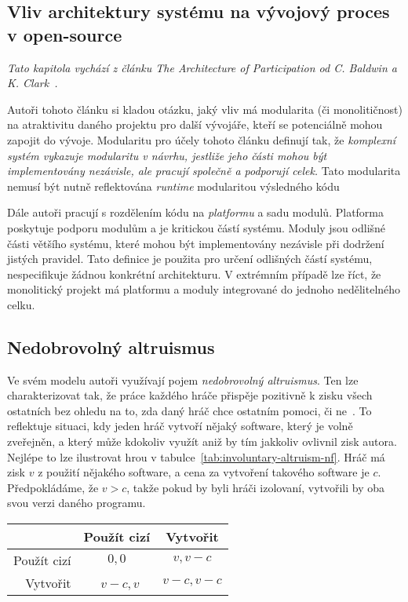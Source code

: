 \begin{multicols}{2}
\section{Vliv architektury systému na vývojový proces v open-source}
\label{ch:architecture-opensource}
	{\em Tato kapitola vychází z článku The Architecture of Participation od C. Baldwin a K. Clark~\cite{architecture-opensource}.}

	Autoři tohoto článku si kladou otázku, jaký vliv má modularita (či monolitičnost) na atraktivitu daného projektu pro další vývojáře, kteří se potenciálně mohou zapojit do vývoje. Modularitu pro účely tohoto článku definují tak, že {\em komplexní systém vykazuje modularitu v návrhu, jestliže jeho části mohou být implementovány nezávisle, ale pracují společně a podporují celek.} Tato modularita nemusí být nutně reflektována {\em runtime} modularitou výsledného kódu~\cite[kap. 2.1]{architecture-opensource}

	Dále autoři pracují s rozdělením kódu na {\em platformu} a sadu modulů. Platforma poskytuje podporu modulům a je kritickou částí systému. Moduly jsou odlišné části většího systému, které mohou být implementovány nezávisle při dodržení jistých pravidel. Tato definice je použita pro určení odlišných částí systému, nespecifikuje žádnou konkrétní architekturu. V extrémním případě lze říct, že monolitický projekt má platformu a moduly integrované do jednoho nedělitelného celku.

	\subsection*{Nedobrovolný altruismus}
		Ve svém modelu autoři využívají pojem {\em nedobrovolný altruismus}. Ten lze charakterizovat tak, že práce každého hráče přispěje pozitivně k zisku všech ostatních bez ohledu na to, zda daný hráč chce ostatním pomoci, či ne~\cite[kap. 3]{architecture-opensource}. To reflektuje situaci, kdy jeden hráč vytvoří nějaký software, který je volně zveřejněn, a který může kdokoliv využít aniž by tím jakkoliv ovlivnil zisk autora. Nejlépe to lze ilustrovat hrou v tabulce~\ref{tab:involuntary-altruism-nf}. Hráč má zisk $v$ z použití nějakého software, a cena za vytvoření takového software je $c$. Předpokládáme, že $v > c$, takže pokud by byli hráči izolovaní, vytvořili by oba svou verzi daného programu.

		\begin{Figure}
		\begin{center}
		\begin{tabular}{r| c c}
				& Použít cizí & Vytvořit \\
				\hline
			Použít cizí & $0,0$ &\cellcolor{gray!20} $v, v-c$ \\
			Vytvořit &\cellcolor{gray!20} $v-c, v$ & $v-c, v-c$ \\
		\end{tabular}
		\end{center}
		\label{tab:involuntary-altruism-nf}
		\end{Figure}


\end{multicols}
